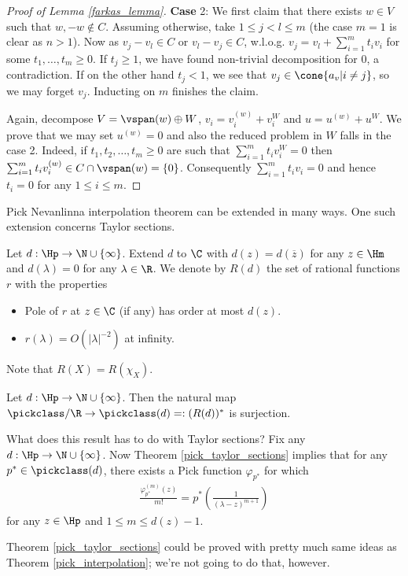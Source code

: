 \begin{proof}[Proof of Lemma \ref{farkas_lemma}]
	\textbf{Case} 2: We first claim that there exists $w \in V$ such that $w, -w \notin C$. Assuming otherwise, take $1 \leq j < l \leq m$ (the case $m = 1$ is clear as $n > 1$). Now as $v_{j} - v_{l} \in C$ or $v_{l} - v_{j} \in C$, w.l.o.g. $v_{j} = v_{l} + \sum_{i = 1}^{m} t_{i} v_{i}$ for some $t_{1}, \ldots, t_{m} \geq 0$. If $t_{j} \geq 1$, we have found non-trivial decomposition for $0$, a contradiction. If on the other hand $t_{j} < 1$, we see that $v_{j} \in \cone\{a_{v} | i \neq j\}$, so we may forget $v_{j}$. Inducting on $m$ finishes the claim.

	Again, decompose $V = \vspan(w) \oplus W$, $v_{i} = v_{i}^{(w)} + v_{i}^{W}$ and $u = u^{(w)} + u^{W}$. We prove that we may set $u^{(w)} = 0$ and also the reduced problem in $W$ falls in the case 2. Indeed, if $t_{1}, t_{2}, \ldots, t_{m} \geq 0$ are such that $\sum_{i = 1}^{m} t_{i} v_{i}^{W} = 0$ then $\sum_{i = 1}^{m} t_{i} v_{i}^{(w)} \in C \cap \vspan(w) = \{0\}$. Consequently $\sum_{i = 1}^{m} t_{i} v_{i} = 0$ and hence $t_{i} = 0$ for any $1 \leq i \leq m$.
\end{proof}

\begin{huom}\label{taylor_section_rem}
	Pick Nevanlinna interpolation theorem can be extended in many ways. One such extension concerns Taylor sections.
	\begin{maar}
		Let $d : \Hp \to \N \cup \{\infty\}$. Extend $d$ to $\C$ with $d(z) = d(\overline{z})$ for any $z \in \Hm$ and $d(\lambda) = 0$ for any $\lambda \in \R$. We denote by $R(d)$ the set of rational functions $r$ with the properties
		\begin{itemize}
			\item Pole of $r$ at $z \in \C$ (if any) has order at most $d(z)$.
			\item $r(\lambda) = O(|\lambda|^{-2})$ at infinity.
		\end{itemize}
	\end{maar}
	Note that $R(X) = R(\chi_{X})$.
	\begin{lause}\label{pick_taylor_sections}
		Let $d : \Hp \to \N \cup \{\infty\}$. Then the natural map $\pickclass/\R \to \pickclass(d) =: (R(d))^{*}$ is surjection.
	\end{lause}
	What does this result has to do with Taylor sections? Fix any $d : \Hp \to \N \cup \{\infty\}$. Now Theorem \ref{pick_taylor_sections} implies that for any $p^{*} \in \pickclass(d)$, there exists a Pick function $\varphi_{p^{*}}$ for which
	\begin{align*}
		\frac{\varphi_{p^{*}}^{(m)}(z)}{m!} = p^{*}\left(\frac{1}{(\lambda - z)^{m + 1}}\right)
	\end{align*}
	for any $z \in \Hp$ and $1 \leq m \leq d(z) - 1$.

	Theorem \ref{pick_taylor_sections} could be proved with pretty much same ideas as Theorem \ref{pick_interpolation}; we're not going to do that, however.
\end{huom}

